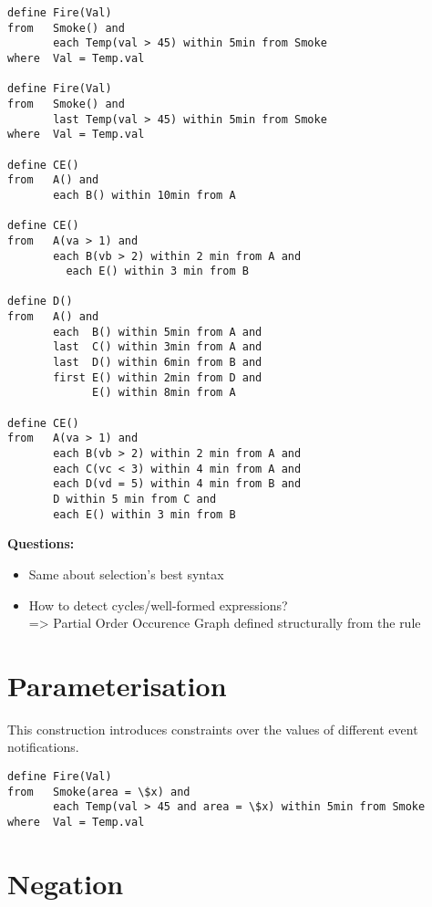 \begin{lstlisting}[language=iotdsl]
define Fire(Val)
from   Smoke() and
       each Temp(val > 45) within 5min from Smoke
where  Val = Temp.val

define Fire(Val)
from   Smoke() and
       last Temp(val > 45) within 5min from Smoke
where  Val = Temp.val

define CE()
from   A() and 
       each B() within 10min from A

define CE()
from   A(va > 1) and 
       each B(vb > 2) within 2 min from A and 
		 each E() within 3 min from B

define D()
from   A() and 
       each  B() within 5min from A and
       last  C() within 3min from A and
       last  D() within 6min from B and
       first E() within 2min from D and
             E() within 8min from A

define CE()
from   A(va > 1) and 
       each B(vb > 2) within 2 min from A and 
       each C(vc < 3) within 4 min from A and 
       each D(vd = 5) within 4 min from B and 
       D within 5 min from C and 
       each E() within 3 min from B
\end{lstlisting}

\medskip
\noindent
\textbf{Questions:}
\begin{itemize}
	\item Same about selection's best syntax
	\item How to detect cycles/well-formed expressions?\\
			=> Partial Order Occurence Graph defined structurally from the rule
\end{itemize}

\section{Parameterisation}
\label{sec:Parameterisation}

This construction introduces constraints over the values of different event notifications.

\begin{lstlisting}[language=iotdsl]
define Fire(Val)
from   Smoke(area = \$x) and
       each Temp(val > 45 and area = \$x) within 5min from Smoke
where  Val = Temp.val
\end{lstlisting}


\section{Negation}
\label{sec:Negation}

